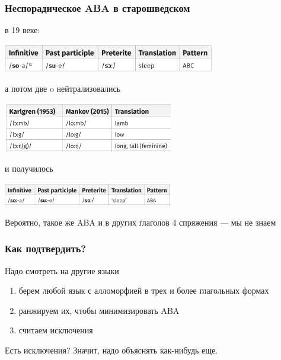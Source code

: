 \documentclass[9pt, t]{beamer}
\begin{document}
\begin{frame}
    \frametitle{Неспорадическое ABA в старошведском}


    в 19 веке:

    \includegraphics[width=25em]{images/19 cent.png}

    \pause
    
    а потом две o нейтрализовались

    \includegraphics[width=20em]{images/change.png}

    и получилось

    \includegraphics[width=20em]{images/sue.png}

    Вероятно, такое же ABA и в других глаголов 4 спряжения — мы не знаем

\end{frame}

\begin{frame}
    \frametitle{Как подтвердить?}

    Надо смотреть на другие языки

    \begin{enumerate}
        \item берем любой язык с алломорфией в трех и более глагольных формах
        \item ранжируем их, чтобы минимизировать ABA
        \item считаем исключения
    \end{enumerate}

    Есть исключения? Значит, надо объяснять как-нибудь еще.
\end{frame}
\end{document}
